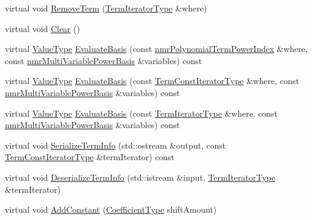 \begin{DoxyCompactItemize}
virtual void \hyperlink{classnmr_bernstein_polynomial_a615e825f6b2c453fa48bf50b387af9bb}{Remove\-Term} (\hyperlink{classnmr_polynomial_container_a276e57445d038e8a16462f47b85719a3}{Term\-Iterator\-Type} \&where)
\item 
virtual void \hyperlink{classnmr_bernstein_polynomial_a7987a19a4cccb2dac54ffee7b77492fb}{Clear} ()
\item 
virtual \hyperlink{classnmr_polynomial_base_a72f0bc16b225e4708bcf15a77ba206e3}{Value\-Type} \hyperlink{classnmr_bernstein_polynomial_a2e259ce60fe4ba4e18649a366e4f90a9}{Evaluate\-Basis} (const \hyperlink{classnmr_polynomial_term_power_index}{nmr\-Polynomial\-Term\-Power\-Index} \&where, const \hyperlink{classnmr_multi_variable_power_basis}{nmr\-Multi\-Variable\-Power\-Basis} \&variables) const 
\item 
virtual \hyperlink{classnmr_polynomial_base_a72f0bc16b225e4708bcf15a77ba206e3}{Value\-Type} \hyperlink{classnmr_bernstein_polynomial_aa47f112a93af89b894da0808171fe168}{Evaluate\-Basis} (const \hyperlink{classnmr_polynomial_container_aba8d31506ab6a487fdc4fe2815469442}{Term\-Const\-Iterator\-Type} \&where, const \hyperlink{classnmr_multi_variable_power_basis}{nmr\-Multi\-Variable\-Power\-Basis} \&variables) const 
\item 
virtual \hyperlink{classnmr_polynomial_base_a72f0bc16b225e4708bcf15a77ba206e3}{Value\-Type} \hyperlink{classnmr_bernstein_polynomial_a655a3b41ac928510914e202332fe54b2}{Evaluate\-Basis} (const \hyperlink{classnmr_polynomial_container_a276e57445d038e8a16462f47b85719a3}{Term\-Iterator\-Type} \&where, const \hyperlink{classnmr_multi_variable_power_basis}{nmr\-Multi\-Variable\-Power\-Basis} \&variables) const 
\item 
virtual void \hyperlink{classnmr_bernstein_polynomial_ab8846bb7223b02b87c366672d4a07a4f}{Serialize\-Term\-Info} (std\-::ostream \&output, const \hyperlink{classnmr_polynomial_container_aba8d31506ab6a487fdc4fe2815469442}{Term\-Const\-Iterator\-Type} \&term\-Iterator) const 
\item 
virtual void \hyperlink{classnmr_bernstein_polynomial_a457024b5819f590ef4a9feb1b803a796}{Deserialize\-Term\-Info} (std\-::istream \&input, \hyperlink{classnmr_polynomial_container_a276e57445d038e8a16462f47b85719a3}{Term\-Iterator\-Type} \&term\-Iterator)
\item 
virtual void \hyperlink{classnmr_bernstein_polynomial_aea0de386d6fba42e5ff2c36d5412b25e}{Add\-Constant} (\hyperlink{classnmr_polynomial_base_a8693efdfc8585ccb49abea69f74f3eef}{Coefficient\-Type} shift\-Amount)

\end{DoxyCompactItemize}
